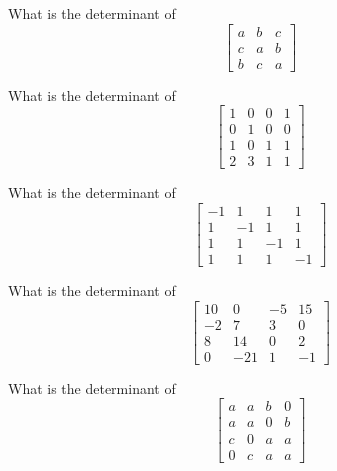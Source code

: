 \bexo
What is the determinant of 
\[
\left[
\begin{array}{ccc}
a& b& c\\
c& a& b\\
b& c& a
\end{array}
\right]
\]
\eexo{}

\bexo
What is the determinant of 
\[
\left[
\begin{array}{cccc}
1& 0& 0& 1\\
0& 1& 0& 0\\
1& 0& 1& 1\\
2& 3& 1& 1
\end{array}
\right]
\]
\eexo{}

\bexo
What is the determinant of 
\[
\left[
\begin{array}{cccc}
-1& 1& 1& 1\\
1& -1& 1& 1\\
1& 1& -1& 1\\
1& 1& 1& -1\end{array}
\right]
\]
\eexo{}

\bexo
What is the determinant of 
\[
\left[
\begin{array}{cccc}
10& 0& -5& 15\\
-2& 7& 3& 0\\
8& 14& 0& 2\\
0& -21& 1& -1\end{array}
\right]
\]
\eexo{}

\bexo
What is the determinant of 
\[
\left[
\begin{array}{cccc}
a& a& b& 0\\
a& a& 0& b\\
c& 0& a& a\\
0& c& a& a
\end{array}
\right]
\]
\eexo{}


